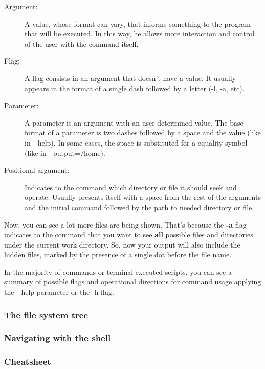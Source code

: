 \documentclass[a4paper,11pt]{article}
\begin{document}
\begin{definitionbox}
    \begin{description}
        \item[Argument:] A value, whose format can vary, that informs something
            to the program that will be executed. In this way, he allows more
            interaction and control of the user with the command itself.
        \item[Flag:] A flag consists in an argument that doesn't have a value.
            It usually appears in the format of a single dash followed by a letter
            (-l, -a, etc).
        \item[Parameter:] A parameter is an argument with an user determined
            value. The base format of a parameter is two dashes followed by
            a space and the value (like in -{}-help). In some cases, the space
            is substituted for a equality symbol (like in -{}-output=/home). 
        \item[Positional argument:] Indicates to the command which directory or
            file it should  seek and operate. Usually presents itself with
            a space from the rest of the arguments and the initial command
            followed by the path to needed directory or file.
    \end{description}
\end{definitionbox}
Now, you can see a lot more files are being shown. That's because the
\textbf{-a} flag indicates to the command that you want to see \textbf{all}
possible files and directories under the current work directory. So, now your
output will also include the hidden files, marked by the presence of a single
dot before the file name.\par
\begin{remarkbox}
In the majority of commands or terminal executed scripts, you can see a summary
of possible flags and operational directions for command usage applying the
-{}-help parameter or the -h flag.
\end{remarkbox}
\subsubsection{The file system tree}

\subsubsection{Navigating with the shell}

\subsubsection{Cheatsheet}
\end{document}
